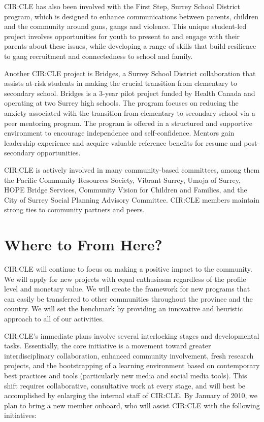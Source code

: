 \documentclass[12pt,DIV11,letterpaper,oneside,abstractoff,headsepline]{scrreprt}
\begin{document}
CIR:CLE has also been involved with the First Step, Surrey School District program, which is designed to enhance communications between parents, children and the community around guns, gangs and violence. This unique student-led project involves opportunities for youth to present to and engage with their parents about these issues, while developing a range of skills that build resilience to gang recruitment and connectedness to school and family.

Another CIR:CLE project is Bridges, a Surrey School District collaboration that assists at-risk students in making the crucial transition from elementary to secondary school. Bridges is a 3-year pilot project funded by Health Canada and operating at two Surrey high schools. The program focuses on reducing the anxiety associated with the transition from elementary to secondary school via a peer mentoring program. The program is offered in a structured and supportive environment to encourage independence and self-confidence. Mentors gain leadership experience and acquire valuable reference benefits for resume and post-secondary opportunities.

CIR:CLE is actively involved in many community-based committees, among them the 
Pacific Community Resources Society, Vibrant Surrey, Umoja of Surrey, HOPE Bridge Services, Community Vision for Children and Families, and the City of Surrey Social Planning Advisory Committee. CIR:CLE members maintain strong ties to community partners and peers.

\newpage
\section{Where to From Here?}
\label{sec-3}
CIR:CLE will continue to focus on making a positive impact to the community. We will apply for new projects with equal enthusiasm regardless of the profile level and monetary value. We will create the framework for new programs that can easily be transferred to other communities throughout the province and the country. We will set the benchmark by providing an innovative and heuristic approach to all of our activities.

CIR:CLE's immediate plans involve several interlocking stages and developmental tasks. Essentially, the core initiative is a movement toward greater interdisciplinary collaboration, enhanced community involvement, fresh research projects, and the bootstrapping of a learning environment based on contemporary best practices and tools (particularly new media and social media tools). This shift requires collaborative, consultative work at every stage, and will best be accomplished by enlarging the internal staff of CIR:CLE. By January of 2010, we plan to bring a new member onboard, who will assist CIR:CLE with the following initiatives:
\end{document}
